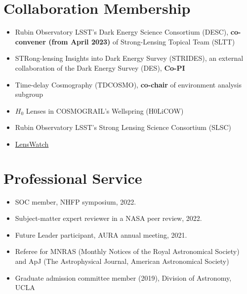\documentclass[margin, line]{res}
\begin{document}
\begin{resume}
\section{\sc Collaboration Membership}
\begin{itemize}
	\item Rubin Observatory LSST's Dark Energy Science Consortium (DESC), \textbf{co-convener (from April 2023)} of Strong-Lensing Topical Team (SLTT) 
	\item STRong-lensing Insights into Dark Energy Survey (STRIDES), an external collaboration of the Dark Energy Survey (DES), \textbf{Co-PI}
	\item Time-delay Cosmography (TDCOSMO), \textbf{co-chair} of environment analysis subgroup
	\item $H_0$ Lenses in COSMOGRAIL's Wellspring (H0LiCOW)
	\item Rubin Observatory LSST's Strong Lensing Science Consortium (SLSC)
	\item \href{https://www.lenswatch.org/}{LensWatch}
\end{itemize}

\section{\sc Professional Service}
\begin{itemize}
\item SOC member, NHFP symposium, 2022.
\item Subject-matter expert reviewer in a NASA peer review, 2022.
\item Future Leader participant, AURA annual meeting, 2021.
\item Referee for MNRAS (Monthly Notices of the Royal Astronomical Society) and ApJ (The Astrophysical Journal, American Astronomical Society)
\item Graduate admission committee member (2019), Division of Astronomy, UCLA
\end{itemize}


\end{resume}
\end{document}
